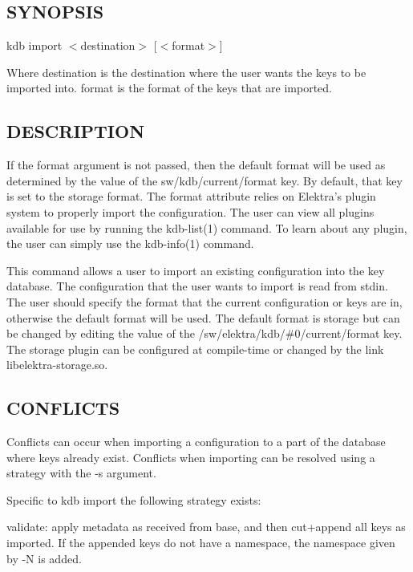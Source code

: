 \subsection*{S\+Y\+N\+O\+P\+S\+IS}

{\ttfamily kdb import $<$destination$>$ \mbox{[}$<$format$>$\mbox{]}}

Where {\ttfamily destination} is the destination where the user wants the keys to be imported into. {\ttfamily format} is the format of the keys that are imported.

\subsection*{D\+E\+S\+C\+R\+I\+P\+T\+I\+ON}

If the {\ttfamily format} argument is not passed, then the default format will be used as determined by the value of the {\ttfamily sw/kdb/current/format} key. By default, that key is set to the {\ttfamily storage} format. The {\ttfamily format} attribute relies on Elektra’s plugin system to properly import the configuration. The user can view all plugins available for use by running the kdb-\/list(1) command. To learn about any plugin, the user can simply use the kdb-\/info(1) command.

This command allows a user to import an existing configuration into the key database. The configuration that the user wants to import is read from {\ttfamily stdin}. The user should specify the format that the current configuration or keys are in, otherwise the default format will be used. The default format is {\ttfamily storage} but can be changed by editing the value of the {\ttfamily /sw/elektra/kdb/\#0/current/format} key. The {\ttfamily storage} plugin can be configured at compile-\/time or changed by the link {\ttfamily libelektra-\/storage.\+so}.

\subsection*{C\+O\+N\+F\+L\+I\+C\+TS}

Conflicts can occur when importing a configuration to a part of the database where keys already exist. Conflicts when importing can be resolved using a strategy with the {\ttfamily -\/s} argument.

Specific to {\ttfamily kdb import} the following strategy exists\+:


\begin{DoxyItemize}
\item {\ttfamily validate}\+: apply metadata as received from base, and then cut+append all keys as imported. If the appended keys do not have a namespace, the namespace given by {\ttfamily -\/N} is added.
\end{DoxyItemize}

